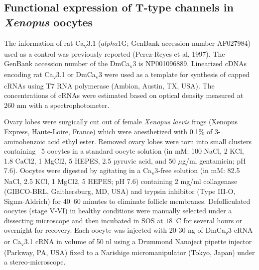 \subsection*{Functional expression of T-type channels in \emph{Xenopus} oocytes}

The information of rat Ca\textsubscript{v}3.1 ($alpha$1G; GenBank accession number AF027984) used as a control was previously reported (Perez-Reyes et al, 1997).
The GenBank accession number of the DmCa\textsubscript{v}3 is NP001096889.
Linearized cDNAs encoding rat Ca\textsubscript{v}3.1 or DmCa\textsubscript{v}3 were used as a template for synthesis of capped cRNAs using T7 RNA polymerase (Ambion, Austin, TX, USA).
The concentrations of cRNAs were estimated based on optical density measured at 260 nm with a spectrophotometer.

Ovary lobes were surgically cut out of female \emph{Xenopus laevis} frogs (Xenopus Express, Haute-Loire, France) which were anesthetized with 0.1\% of 3-aminobenzoic acid ethyl ester.
Removed ovary lobes were torn into small clusters containing ~5 oocytes in a standard oocyte solution (in mM: 100 NaCl, 2 KCl, 1.8 CaCl2, 1 MgCl2, 5 HEPES, 2.5 pyruvic acid, and 50 $\mu$g/ml gentamicin; pH 7.6).
Oocytes were digested by agitating in a Ca\textsubscript{v}3-free solution (in mM: 82.5 NaCl, 2.5 KCl, 1 MgCl2, 5 HEPES; pH 7.6) containing 2 mg/ml collagenase (GIBCO-BRL, Gaithersburg, MD, USA) and trypsin inhibitor (Type III-O, Sigma-Aldrich) for 40~60 minutes to eliminate follicle membranes.
Defolliculated oocytes (stage V-VI) in healthy conditions were manually selected under a dissecting microscope and then incubated in SOS at $18\,^{\circ}\mathrm{C}$ for several hours or overnight for recovery.
Each oocyte was injected with 20-30 ng of DmCa\textsubscript{v}3 cRNA or Ca\textsubscript{v}3.1 cRNA in volume of 50 nl using a Drummond Nanoject pipette injector (Parkway, PA, USA) fixed to a Narishige micromanipulator (Tokyo, Japan) under a stereo-microscope.
    
    